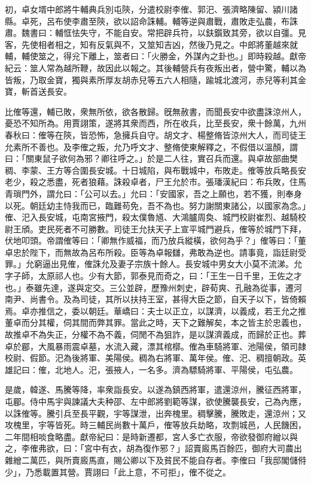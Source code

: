 \begin{pinyinscope}
初，卓女壻中郎將牛輔典兵別屯陝，分遣校尉李傕、郭汜、張濟略陳留、潁川諸縣。卓死，呂布使李肅至陝，欲以詔命誅輔。輔等逆與肅戰，肅敗走弘農，布誅肅。魏書曰：輔恇怯失守，不能自安。常把辟兵符，以鈇鑕致其旁，欲以自彊。見客，先使相者相之，知有反氣與不，又筮知吉凶，然後乃見之。中郎將董越來就輔，輔使筮之，得兊下離上，筮者曰：「火勝金，外謀內之卦也。」即時殺越。獻帝紀云：筮人常為越所鞭，故因此以報之。其後輔營兵有夜叛出者，營中驚，輔以為皆叛，乃取金寶，獨與素所厚友胡赤兒等五六人相隨，踰城北渡河，赤兒等利其金寶，斬首送長安。

比傕等還，輔已敗，衆無所依，欲各散歸。旣無赦書，而聞長安中欲盡誅涼州人，憂恐不知所為。用賈詡策，遂將其衆而西，所在收兵，比至長安，衆十餘萬，九州春秋曰：傕等在陝，皆恐怖，急擁兵自守。胡文才、楊整脩皆涼州大人，而司徒王允素所不善也。及李傕之叛，允乃呼文才、整脩使東解釋之，不假借以溫顏，謂曰：「關東鼠子欲何為邪？卿往呼之。」於是二人往，實召兵而還。與卓故部曲樊稠、李蒙、王方等合圍長安城。十日城陷，與布戰城中，布敗走。傕等放兵略長安老少，殺之悉盡，死者狼藉。誅殺卓者，尸王允於市。張璠漢紀曰：布兵敗，住馬青瑣門外，謂允曰：「公可以去。」允曰：「安國家，吾之上願也，若不獲，則奉身以死。朝廷幼主恃我而已，臨難苟免，吾不為也。努力謝關東諸公，以國家為念。」傕、汜入長安城，屯南宮掖門，殺太僕魯馗、大鴻臚周奐、城門校尉崔烈、越騎校尉王頎。吏民死者不可勝數。司徒王允扶天子上宣平城門避兵，傕等於城門下拜，伏地叩頭。帝謂傕等曰：「卿無作威福，而乃放兵縱橫，欲何為乎？」傕等曰：「董卓忠於陛下，而無故為呂布所殺。臣等為卓報讎，弗敢為逆也。請事竟，詣廷尉受罪。」允窮逼出見傕，傕誅允及妻子宗族十餘人。長安城中男女大小莫不流涕。允字子師，太原祁人也。少有大節，郭泰見而奇之，曰：「王生一日千里，王佐之才也。」泰雖先達，遂與定交。三公並辟，歷豫州刺史，辟荀爽、孔融為從事，遷河南尹、尚書令。及為司徒，其所以扶持王室，甚得大臣之節，自天子以下，皆倚賴焉。卓亦推信之，委以朝廷。華嶠曰：夫士以正立，以謀濟，以義成，若王允之推董卓而分其權，伺其間而弊其罪。當此之時，天下之難解矣，本之皆主於忠義也，故推卓不為失正，分權不為不義，伺閒不為狙詐，是以謀濟義成，而歸於正也。葬卓於郿，大風暴雨震卓墓，水流入藏，漂其棺槨。傕為車騎將軍、池陽侯，領司隷校尉、假節。汜為後將軍、美陽侯。稠為右將軍、萬年侯。傕、汜、稠擅朝政。英雄記曰：傕，北地人。汜，張掖人，一名多。濟為驃騎將軍、平陽侯，屯弘農。

是歲，韓遂、馬騰等降，率衆詣長安。以遂為鎮西將軍，遣還涼州，騰征西將軍，屯郿。侍中馬宇與諫議大夫种邵、左中郎將劉範等謀，欲使騰襲長安，己為內應，以誅傕等。騰引兵至長平觀，宇等謀泄，出奔槐里。稠擊騰，騰敗走，還涼州；又攻槐里，宇等皆死。時三輔民尚數十萬戶，傕等放兵劫略，攻剽城邑，人民饑困，二年間相啖食略盡。獻帝紀曰：是時新遷都，宮人多亡衣服，帝欲發御府繒以與之，李傕弗欲，曰：「宮中有衣，胡為復作邪？」詔賣廄馬百餘匹，御府大司農出雜繒二萬匹，與所賣廄馬直，賜公卿以下及貧民不能自存者。李傕曰「我邸閣儲偫少」，乃悉載置其營。賈詡曰「此上意，不可拒」，傕不從之。


\end{pinyinscope}
